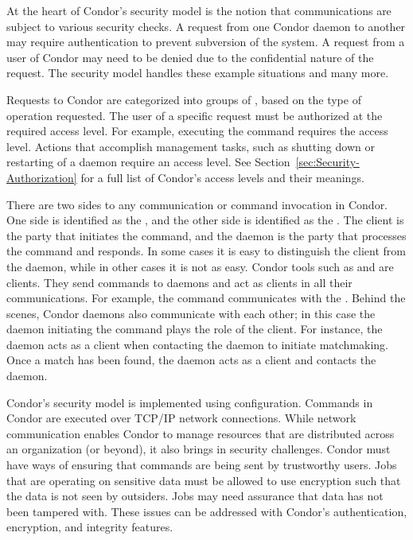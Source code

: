 At the heart of Condor's security model is the notion that 
communications are subject to various security checks. 
A request from one Condor daemon to another may require
authentication to prevent subversion of the system.
A request from a user of Condor may need to be denied
due to the confidential nature of the request.
The security model handles these example situations
and many more.

Requests to Condor are
categorized into groups of ,
based on the type of operation requested.
The user of a specific request must be authorized at
the required access level.
For example,
executing the  command requires
the  access level.
Actions that accomplish management tasks,
such as shutting down or restarting of a daemon
require an  access level.
See
Section~\ref{sec:Security-Authorization}
for a full list of Condor's access levels and their meanings.

There are two sides to any communication or command invocation in Condor.
One side is identified as the ,
and the other side is identified as the .
The client is the party that initiates the command,
and the daemon is the party that processes the command and responds.
In some cases it is easy to distinguish the
client from the daemon, while in other cases it is not as easy.
Condor tools such as  and  are clients.
They send commands to daemons and act as clients in all their communications.
For example, the  command communicates
with the .
Behind the scenes, Condor daemons also communicate with each other;
in this case the daemon initiating the command plays the role of the client.
For instance,
the  daemon acts as a client when contacting the
 daemon to initiate matchmaking.
Once a match has been found,
the  daemon acts as a client and contacts the
 daemon.

Condor's security model
is implemented using configuration.
Commands in Condor are executed over TCP/IP network connections.
While network communication enables Condor to manage
resources that are distributed across an organization (or beyond),
it also brings in security challenges.
Condor must have ways of ensuring that commands are being sent
by trustworthy users.
Jobs that are operating on sensitive data must be allowed to use
encryption such that the data is not seen by outsiders.
Jobs may need assurance that data has not been tampered with.
These issues
can be addressed with Condor's authentication,
encryption, and integrity features.


